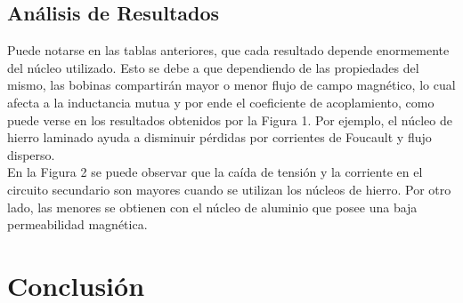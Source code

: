 \documentclass[a4paper,12pt]{article}
\begin{document}
\subsection{Análisis de Resultados}
\hspace{1cm} Puede notarse en las tablas anteriores, que cada resultado depende enormemente del núcleo utilizado. Esto se debe a que 
dependiendo de las propiedades del mismo, las bobinas compartirán mayor o menor flujo de campo magnético, lo cual afecta a la 
inductancia mutua y por ende el coeficiente de acoplamiento, como puede verse en los resultados obtenidos por la Figura 1. Por 
ejemplo, el núcleo de hierro laminado ayuda a disminuir pérdidas por corrientes de Foucault y flujo disperso.
\\En la Figura 2 se puede observar que la caída de tensión y la corriente en el circuito secundario son mayores cuando se utilizan 
los núcleos de hierro. Por otro lado, las menores se obtienen con el núcleo de aluminio que posee una baja permeabilidad magnética.


\section{Conclusión}
\end{document}
